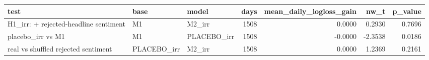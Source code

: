 \begin{tabular}{lllrrrr}
\toprule
test & base & model & days & mean\_daily\_logloss\_gain & nw\_t & p\_value \\
\midrule
H1\_irr: + rejected-headline sentiment & M1 & M2\_irr & 1508 & 0.0000 & 0.2930 & 0.7696 \\
placebo\_irr vs M1 & M1 & PLACEBO\_irr & 1508 & -0.0000 & -2.3538 & 0.0186 \\
real vs shuffled rejected sentiment & PLACEBO\_irr & M2\_irr & 1508 & 0.0000 & 1.2369 & 0.2161 \\
\bottomrule
\end{tabular}
